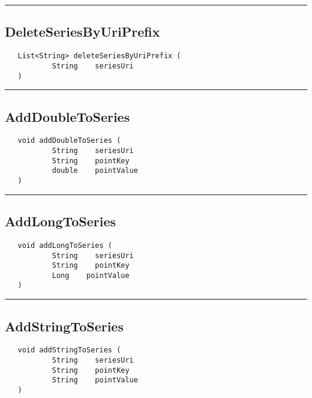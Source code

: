 \rule{15cm}{2pt}
\subsection{DeleteSeriesByUriPrefix}
\label{Api:DeleteSeriesByUriPrefix}
\begin{verbatim}
   List<String> deleteSeriesByUriPrefix (
           String    seriesUri
   )
\end{verbatim}



\rule{15cm}{2pt}
\subsection{AddDoubleToSeries}
\label{Api:AddDoubleToSeries}
\begin{verbatim}
   void addDoubleToSeries (
           String    seriesUri
           String    pointKey
           double    pointValue
   )
\end{verbatim}



\rule{15cm}{2pt}
\subsection{AddLongToSeries}
\label{Api:AddLongToSeries}
\begin{verbatim}
   void addLongToSeries (
           String    seriesUri
           String    pointKey
           Long    pointValue
   )
\end{verbatim}



\rule{15cm}{2pt}
\subsection{AddStringToSeries}
\label{Api:AddStringToSeries}
\begin{verbatim}
   void addStringToSeries (
           String    seriesUri
           String    pointKey
           String    pointValue
   )
\end{verbatim}



